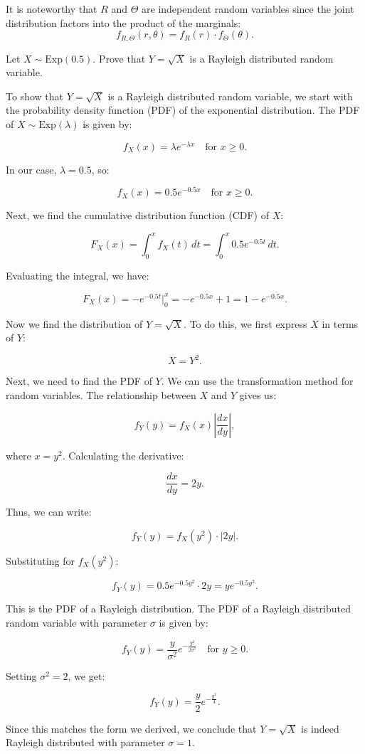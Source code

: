 It is noteworthy that \(R\) and \(\Theta\) are independent random variables since the joint distribution factors into the product of the marginals:
\[
f_{R,\Theta}(r, \theta) = f_R(r) \cdot f_\Theta(\theta).
\]

\begin{exercise}
Let \( X \sim \text{Exp}(0.5) \). Prove that \( Y = \sqrt{X} \) is a Rayleigh distributed random variable.
\end{exercise}

\begin{solution}
To show that \( Y = \sqrt{X} \) is a Rayleigh distributed random variable, we start with the probability density function (PDF) of the exponential distribution. The PDF of \( X \sim \text{Exp}(\lambda) \) is given by:

\[
f_X(x) = \lambda e^{-\lambda x} \quad \text{for } x \geq 0.
\]

In our case, \( \lambda = 0.5 \), so:

\[
f_X(x) = 0.5 e^{-0.5 x} \quad \text{for } x \geq 0.
\]

Next, we find the cumulative distribution function (CDF) of \( X \):

\[
F_X(x) = \int_0^x f_X(t) \, dt = \int_0^x 0.5 e^{-0.5 t} \, dt.
\]

Evaluating the integral, we have:

\[
F_X(x) = -e^{-0.5 t} \bigg|_0^x = -e^{-0.5 x} + 1 = 1 - e^{-0.5 x}.
\]

Now we find the distribution of \( Y = \sqrt{X} \). To do this, we first express \( X \) in terms of \( Y \):

\[
X = Y^2.
\]

Next, we need to find the PDF of \( Y \). We can use the transformation method for random variables. The relationship between \( X \) and \( Y \) gives us:

\[
f_Y(y) = f_X(x) \left| \frac{dx}{dy} \right|,
\]

where \( x = y^2 \). Calculating the derivative:

\[
\frac{dx}{dy} = 2y.
\]

Thus, we can write:

\[
f_Y(y) = f_X(y^2) \cdot |2y|.
\]

Substituting for \( f_X(y^2) \):

\[
f_Y(y) = 0.5 e^{-0.5 y^2} \cdot 2y = y e^{-0.5 y^2}.
\]

This is the PDF of a Rayleigh distribution. The PDF of a Rayleigh distributed random variable with parameter \( \sigma \) is given by:

\[
f_Y(y) = \frac{y}{\sigma^2} e^{-\frac{y^2}{2\sigma^2}} \quad \text{for } y \geq 0.
\]

Setting \( \sigma^2 = 2 \), we get:

\[
f_Y(y) = \frac{y}{2} e^{-\frac{y^2}{4}}.
\]

Since this matches the form we derived, we conclude that \( Y = \sqrt{X} \) is indeed Rayleigh distributed with parameter \( \sigma = 1 \).
\end{solution}


